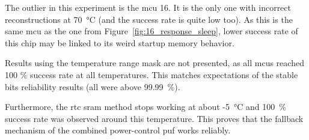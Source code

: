 The outlier in this experiment is the \gls{mcu} 16. It is the only one with incorrect reconstructions at 70~°C (and the success rate is quite low too). As this is the same \gls{mcu} as the one from Figure~\ref{fig:16_response_sleep}, lower success rate of this chip may be linked to its weird startup memory behavior.

Results using the temperature range mask are not presented, as all \glspl{mcu} reached 100 \% success rate at all temperatures. This matches expectations of the stable bits reliability results (all were above 99.99~\%).

Furthermore, the \gls{rtc} \gls{sram} method stops working at about -5~°C and 100~\% success rate was observed around this temperature. This proves that the fallback mechanism of the combined power-control \gls{puf} works reliably.

